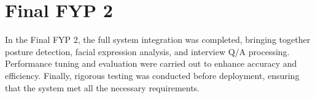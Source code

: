 \section{Final FYP 2}
In the Final FYP 2, the full system integration was completed, bringing together posture detection, facial expression analysis, and interview Q/A processing. Performance tuning and evaluation were carried out to enhance accuracy and efficiency. Finally, rigorous testing was conducted before deployment, ensuring that the system met all the necessary requirements.

